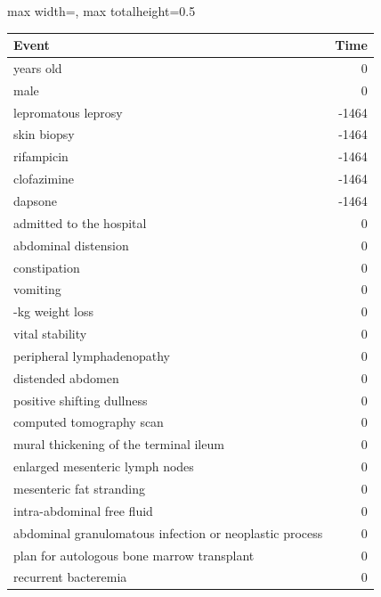 \begin{ChSixUncaptionedFigure}
\begin{ChSixFloatBody}

\centering
\begin{adjustbox}{max width=\linewidth, max totalheight=0.5\textheight}
\begin{tcolorbox}

\begin{minipage}[t]{0.49\textwidth}\vspace{0pt}
\begin{tcolorbox}[ChSix/annobox,title={DeepSeek-R1-IQ1 annotation}]
\ChSixAnnotationTableStyle
\begin{tabular}{>{\raggedright\arraybackslash}p{} r}
\toprule
\textbf{Event} & \textbf{Time} \\
\midrule
57 years old & 0 \\
male & 0 \\
lepromatous leprosy & -1464 \\
skin biopsy & -1464 \\
rifampicin & -1464 \\
clofazimine & -1464 \\
dapsone & -1464 \\
admitted to the hospital & 0 \\
abdominal distension & 0 \\
constipation & 0 \\
vomiting & 0 \\
10-kg weight loss & 0 \\
vital stability & 0 \\
peripheral lymphadenopathy & 0 \\
distended abdomen & 0 \\
positive shifting dullness & 0 \\
computed tomography scan & 0 \\
mural thickening of the terminal ileum & 0 \\
enlarged mesenteric lymph nodes & 0 \\
mesenteric fat stranding & 0 \\
intra-abdominal free fluid & 0 \\
abdominal granulomatous infection or neoplastic process & 0 \\
plan for autologous bone marrow transplant & 0 \\
recurrent bacteremia & 0 \\

\end{tabular}
\end{tcolorbox}
\end{minipage}
\end{tcolorbox}
\end{adjustbox}
\end{ChSixFloatBody}
\end{ChSixUncaptionedFigure}
